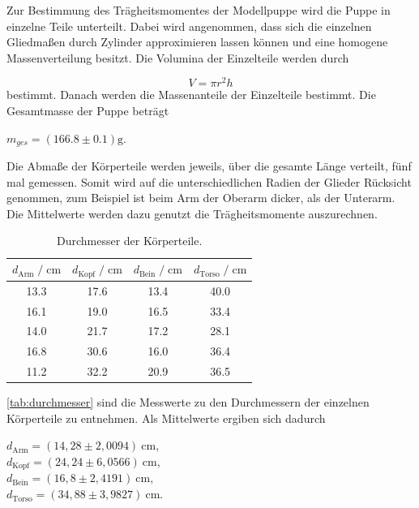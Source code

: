 Zur Bestimmung des Trägheitsmomentes der Modellpuppe wird die Puppe in einzelne Teile unterteilt. Dabei wird angenommen,
dass sich die einzelnen Gliedmaßen durch Zylinder approximieren lassen können und eine homogene Massenverteilung besitzt. Die
Volumina der Einzelteile werden durch

\begin{equation}
  V = \pi r^2h
  \label{eqn:Volumen}
\end{equation}
 bestimmt. Danach werden die Massenanteile der Einzelteile bestimmt. Die Gesamtmasse der Puppe beträgt 

\begin{center}
  $m_{ges} = (166.8\pm 0.1)\si{\gram}$.
\end{center}


Die Abmaße der Körperteile werden jeweils, über die gesamte Länge verteilt, fünf mal gemessen. Somit wird auf die unterschiedlichen
Radien der Glieder Rücksicht genommen, zum Beispiel ist beim Arm der Oberarm dicker, als der Unterarm. Die Mittelwerte werden dazu genutzt die
Trägheitsmomente auszurechnen.

\begin{table}
  \centering
    \caption{Durchmesser der Körperteile.}
    \label{tab:durchmesser}
    \begin{tabular}{c c c c}
    \toprule
    $d_\text{Arm} \;/\; \si{\centi\meter}$ & $d_\text{Kopf} \;/\; \si{\centi\meter}$ & $d_\text{Bein} \;/\; \si{\centi\meter}$ & $d_\text{Torso} \;/\; \si{\centi\meter}$ \\
    \midrule
    13.3 & 17.6 & 13.4 & 40.0 \\
    16.1 & 19.0 & 16.5 & 33.4 \\
    14.0 & 21.7 & 17.2 & 28.1 \\
    16.8 & 30.6 & 16.0 & 36.4 \\
    11.2 & 32.2 & 20.9 & 36.5 \\
    \bottomrule
  \end{tabular}
\end{table}


\autoref{tab:durchmesser} sind die Messwerte zu den Durchmessern der einzelnen Körperteile zu entnehmen. Als Mittelwerte ergiben sich dadurch
\begin{center}
  $d_{\text{Arm}} = (14,28 \pm 2,0094)\: \si{\centi\meter}$, \\
  $d_{\text{Kopf}} = (24,24 \pm 6,0566)\: \si{\centi\meter}$, \\
  $d_{\text{Bein}} = (16,8 \pm 2,4191)\: \si{\centi\meter}$, \\
  $d_{\text{Torso}} = (34,88 \pm 3,9827)\: \si{\centi\meter}$. \\ 
\end{center}

